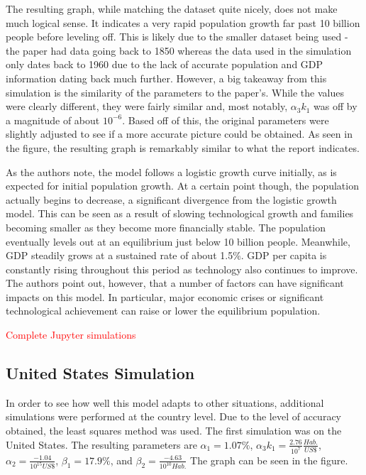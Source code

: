 \documentclass[a4paper]{article}
\newcommand{\todo}[1]{{\Large\textcolor{red}{#1}}}
\begin{document}
The resulting graph, while matching the dataset quite nicely, does not make much logical sense. It indicates a very rapid population growth far past 10 billion people before leveling off. This is likely due to the smaller dataset being used - the paper had data going back to 1850 whereas the data used in the simulation only dates back to 1960 due to the lack of accurate population and GDP information dating back much further. However, a big takeaway from this simulation is the similarity of the parameters to the paper's. While the values were clearly different, they were fairly similar and, most notably, $\alpha_3 k_1$ was off by a magnitude of about $10^{-6}$. Based off of this, the original parameters were slightly adjusted to see if a more accurate picture could be obtained. As seen in the figure, the resulting graph is remarkably similar to what the report indicates. 

As the authors note, the model follows a logistic growth curve initially, as is expected for initial population growth. At a certain point though, the population actually begins to decrease, a significant divergence from the logistic growth model. This can be seen as a result of slowing technological growth and families becoming smaller as they become more financially stable. The population eventually levels out at an equilibrium just below 10 billion people. Meanwhile, GDP steadily grows at a sustained rate of about 1.5\%. GDP per capita is constantly rising throughout this period as technology also continues to improve. The authors point out, however, that a number of factors can have significant impacts on this model. In particular, major economic crises or significant technological achievement can raise or lower the equilibrium population. 

\todo{Complete Jupyter simulations}

\subsection{United States Simulation}

In order to see how well this model adapts to other situations, additional simulations were performed at the country level. Due to the level of accuracy obtained, the least squares method was used. The first simulation was on the United States. The resulting parameters are $\alpha_1 = 1.07\%$, $\alpha_3 k_1 = \frac{2.76}{10^{7}}\frac{Hab.}{US \$}$, $\alpha_2 = \frac{-1.04}{10^{15} US\$}$, $\beta_1 = 17.9\%$, and $\beta_2 = \frac{-4.63}{10^{10} Hab.}$ The graph can be seen in the figure.
\end{document}
